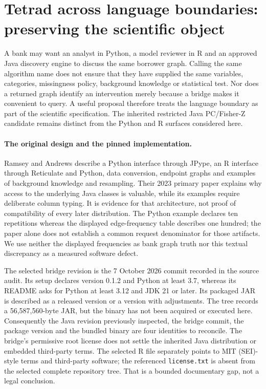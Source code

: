 \section{Tetrad across language boundaries: preserving the scientific object}
\label{sec:exec24-tetrad-bridge-reuse}

A bank may want an analyst in Python, a model reviewer in R and an approved
Java discovery engine to discuss the same borrower graph. Calling the same
algorithm name does not ensure that they have supplied the same variables,
categories, missingness policy, background knowledge or statistical test.
Nor does a returned graph identify an intervention merely because a bridge
makes it convenient to query. A useful proposal therefore treats the language
boundary as part of the scientific specification. The inherited restricted
Java PC/Fisher-Z candidate remains distinct from the Python and R surfaces
considered here.\citep{exec13_tetrad_reuse_decision,exec24_pytetrad_source}

\paragraph{The original design and the pinned implementation.}
Ramsey and Andrews describe a Python interface through JPype, an R interface
through Reticulate and Python, data conversion, endpoint graphs and examples
of background knowledge and resampling. Their 2023 primary paper explains why
access to the underlying Java classes is valuable, while its examples require
deliberate column typing. It is evidence for that architecture, not proof of
compatibility of every later distribution. The Python example declares ten
repetitions whereas the displayed edge-frequency table describes one hundred;
the paper alone does not establish a common request denominator for those
artifacts. We use neither the displayed frequencies as bank graph truth nor
this textual discrepancy as a measured software defect.\citep{exec24_pytetrad_paper}

The selected bridge revision is the 7 October 2026 commit recorded in the
source audit. Its setup declares version 0.1.2 and Python at least 3.7, whereas
its README asks for Python at least 3.12 and JDK 21 or later. Its packaged JAR
is described as a released version or a version with adjustments. The tree
records a 56,587,560-byte JAR, but the binary has not been acquired or executed
here. Consequently the Java revision previously inspected, the bridge commit,
the package version and the bundled binary are four identities to reconcile.
The bridge's permissive root license does not settle the inherited Java
distribution or embedded third-party terms. The selected R file separately
points to MIT (SEI)-style terms and third-party software; the referenced
\texttt{license.txt} is absent from the selected complete repository tree.
That is a bounded documentary gap, not a legal conclusion.
\citep{exec24_pytetrad_source,exec13_tetrad_reuse_primary}

